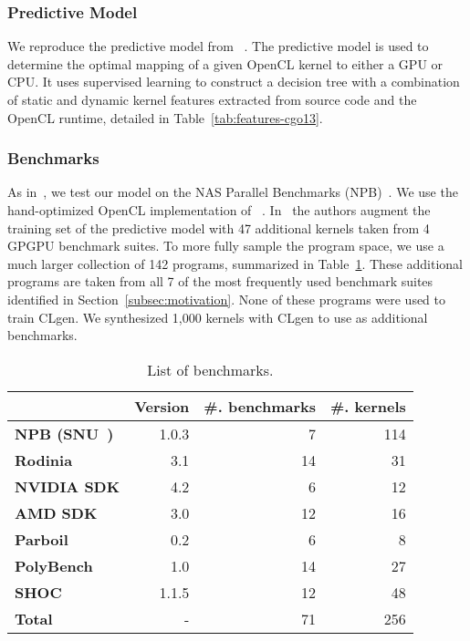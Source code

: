 \subsubsection{Predictive Model} We reproduce the predictive model from \citeauthor{Grewe2013}~\cite{Grewe2013}. The predictive model is used to determine the optimal mapping of a given OpenCL kernel to either a GPU or CPU. It uses supervised learning to construct a decision tree with a combination of static and dynamic kernel features extracted from source code and the OpenCL runtime, detailed in Table~\ref{tab:features-cgo13}.

\subsubsection{Benchmarks} As in~\cite{Grewe2013}, we test our model on the NAS Parallel Benchmarks (NPB)~\cite{Bailey1991a}. We use the hand-optimized OpenCL implementation of \citeauthor{Seo2011}~\cite{Seo2011}. In~\cite{Grewe2013} the authors augment the training set of the predictive model with 47 additional kernels taken from 4 GPGPU benchmark suites.  To more fully sample the program space, we use a much larger collection of 142 programs, summarized in Table~\ref{tab:benchmarks}. These additional programs are taken from all 7 of the most frequently used benchmark suites identified in Section~\ref{subsec:motivation}. None of these programs were used to train CLgen. We synthesized 1,000 kernels with CLgen to use as additional benchmarks.

\begin{table}%
  \centering%
  \begin{tabular}{l r r r}
    \toprule
    & \textbf{Version} & \textbf{\#. benchmarks} & \textbf{\#. kernels}\\
    \midrule
    \textbf{NPB (SNU~\cite{Seo2011})} & 1.0.3 & 7 & 114 \\
    \textbf{Rodinia~\cite{Che2009}} & 3.1 & 14 & 31 \\
    \textbf{NVIDIA SDK} & 4.2 & 6 & 12 \\
    \textbf{AMD SDK} & 3.0 & 12 & 16 \\
    \textbf{Parboil~\cite{Stratton2012}} & 0.2 & 6 & 8 \\
    \textbf{PolyBench~\cite{Grauer-Gray2012}} & 1.0 & 14 & 27 \\
    \textbf{SHOC~\cite{Danalis2010}} & 1.1.5 & 12 & 48 \\
    \textbf{Total} & - & 71 & 256 \\
  \end{tabular}
  \caption{List of benchmarks.} %
  \label{tab:benchmarks} %
\end{table}

